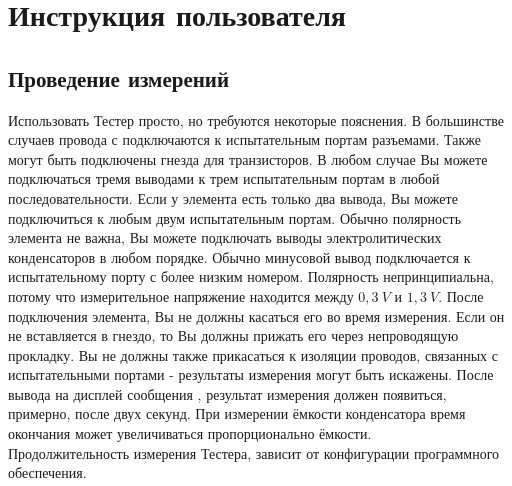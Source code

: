 \chapter{Инструкция пользователя}
\label{sec:manual}
\section{Проведение измерений }
Использовать Тестер просто, но требуются некоторые пояснения. В большинстве случаев провода с  
подключаются к испытательным портам разъемами. Также могут быть подключены гнезда для транзисторов. В любом случае 
Вы можете подключаться тремя выводами к трем испытательным портам в любой последовательности. Если у элемента есть 
только два вывода, Вы можете подключиться к любым двум испытательным портам. Обычно полярность элемента не важна, 
Вы можете подключать выводы электролитических конденсаторов в любом порядке. Обычно минусовой вывод подключается к 
испытательному порту с более низким номером. Полярность  непринципиальна, потому что измерительное напряжение 
находится между \(0,3~V\) и \(1,3~V\). После подключения элемента, Вы не должны касаться его во время измерения. 
Если он не вставляется в гнездо, то Вы должны прижать его через непроводящую прокладку. Вы не должны также 
прикасаться к изоляции проводов, связанных с испытательными портами - результаты измерения могут быть искажены. 
После вывода на дисплей сообщения , результат измерения должен появиться, примерно, после двух секунд. 
При  измерении ёмкости конденсатора время окончания  может увеличиваться пропорционально ёмкости.\\ 

Продолжительность измерения Тестера, зависит от конфигурации программного обеспечения.

